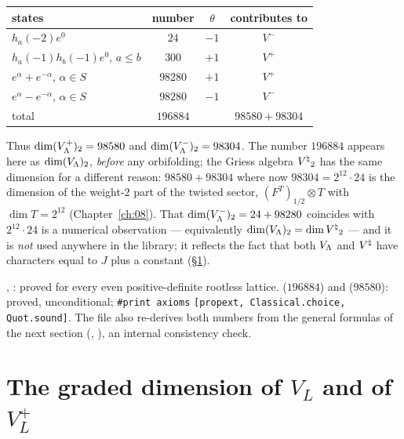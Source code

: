 \begin{example}\label{ch04:ex:wt2}
\begin{center}
\begin{tabular}{lccc}
\toprule
states & number & $\theta$ & contributes to \\
\midrule
$h_a(-2)e^0$ & $24$ & $-1$ & $V^-$\\
$h_a(-1)h_b(-1)e^0$, $a\le b$ & $300$ & $+1$ & $V^+$\\
$e^\alpha+e^{-\alpha}$, $\alpha\in S$ & $98280$ & $+1$ & $V^+$\\
$e^\alpha-e^{-\alpha}$, $\alpha\in S$ & $98280$ & $-1$ & $V^-$\\
\midrule
total & $196884$ & & $98580+98304$\\
\bottomrule
\end{tabular}
\end{center}
Thus $\dim(V_{\Lambda}^+)_2=98580$ and $\dim(V_{\Lambda}^-)_2=98304$. The number $196884$ appears here as
$\dim(V_{\Lambda})_2$, \emph{before} any orbifolding; the Griess algebra ${V^{\natural}}_2$ has the same
dimension for a different reason: $98580+98304$ where now $98304=2^{12}\cdot24$ is the dimension of
the weight-$2$ part of the twisted sector, $(F^{T})_{1/2}\otimes T$ with $\dim T=2^{12}$ (Chapter~\ref{ch:08}).
That $\dim(V_{\Lambda}^-)_2=24+98280$ coincides with $2^{12}\cdot24$ is a numerical observation
--- equivalently $\dim(V_{\Lambda})_2=\dim{V^{\natural}}_2$ --- and it is \emph{not} used anywhere in the
library; it reflects the fact that both $V_{\Lambda}$ and ${V^{\natural}}$ have characters equal to $J$ plus a
constant (\S\ref{ch04:sec:gradeddim}).
\end{example}

\begin{status}
, : proved for every even positive-definite
rootless lattice.  ($196884$) and
 ($98580$): proved, unconditional; \texttt{\#print axioms}
\texttt{[propext, Classical.choice, Quot.sound]}. The file  also
re-derives both numbers from the general formulas of the next section
(, ), an
internal consistency check.
\end{status}

\section{The graded dimension of \texorpdfstring{$V_L$}{VL} and of \texorpdfstring{$V_L^+$}{VL+}}\label{ch04:sec:gradeddim}

